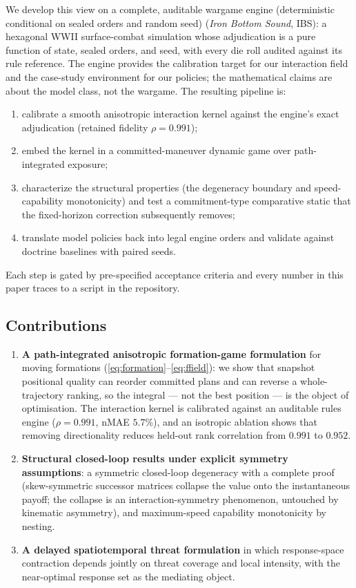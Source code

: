 \documentclass[12pt,a4paper]{article}
\begin{document}
We develop this view on a complete, auditable wargame engine (deterministic conditional on sealed orders and random seed)
(\emph{Iron Bottom Sound}, IBS): a hexagonal WWII surface-combat simulation
whose adjudication is a pure function of state, sealed orders, and seed, with
every die roll audited against its rule reference.  The engine provides the
calibration target for our interaction field and the case-study environment for
our policies; the mathematical claims are about the model class, not the
wargame.  The resulting pipeline is:
\begin{enumerate}
\item calibrate a smooth anisotropic interaction kernel against the engine's
exact adjudication (retained fidelity $\rho=0.991$);
\item embed the kernel in a committed-maneuver dynamic game over
path-integrated exposure;
\item characterize the structural properties (the degeneracy boundary and
speed-capability monotonicity) and test a commitment-type comparative static
that the fixed-horizon correction subsequently removes;
\item translate model policies back into legal engine orders and validate
against doctrine baselines with paired seeds.
\end{enumerate}
Each step is gated by pre-specified acceptance criteria and every number in
this paper traces to a script in the repository.

\subsection{Contributions}
\begin{enumerate}
\item \textbf{A path-integrated anisotropic formation-game formulation}
for moving formations (\eqref{eq:formation}--\eqref{eq:ffield}): we show that
snapshot positional quality can reorder committed plans and can reverse a
whole-trajectory ranking, so the integral --- not the best position --- is the
object of optimisation.  The interaction kernel is calibrated against an
auditable rules engine ($\rho=0.991$, nMAE $5.7\%$), and an isotropic
ablation shows that removing directionality reduces held-out rank correlation
from $0.991$ to $0.952$.
\item \textbf{Structural closed-loop results under explicit symmetry
assumptions}: a symmetric closed-loop degeneracy with a complete proof
(skew-symmetric successor matrices collapse the value onto the instantaneous
payoff; the collapse is an interaction-symmetry phenomenon, untouched by
kinematic asymmetry), and maximum-speed capability monotonicity by nesting.
\item \textbf{A delayed spatiotemporal threat formulation} in which
response-space contraction depends jointly on threat coverage and local
intensity, with the near-optimal response set as the mediating object.
\end{enumerate}
\end{document}
